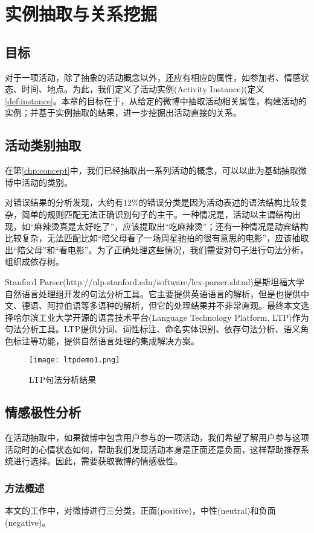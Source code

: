 \chapter{实例抽取与关系挖掘}
\section{目标}
对于一项活动，除了抽象的活动概念以外，还应有相应的属性，如参加者、情感状态、时间、地点。为此，我们定义了活动实例(Activity Instance)(定义\ref{def:instance}。本章的目标在于，从给定的微博中抽取活动相关属性，构建活动的实例；并基于实例抽取的结果，进一步挖掘出活动直接的关系。

\section{活动类别抽取}
在第\ref{chp:concept}中，我们已经抽取出一系列活动的概念，可以以此为基础抽取微博中活动的类别。

对错误结果的分析发现，大约有12\%的错误分类是因为活动表述的语法结构比较复杂，简单的规则匹配无法正确识别句子的主干。一种情况是，活动以主谓结构出现，如``麻辣烫真是太好吃了''，应该提取出``吃麻辣烫''；还有一种情况是动宾结构比较复杂，无法匹配比如``陪父母看了一场周星驰拍的很有意思的电影''，应该抽取出``陪父母''和``看电影''。为了正确处理这些情况，我们需要对句子进行句法分析，组织成依存树。

Stanford Parser(http://nlp.stanford.edu/software/lex-parser.shtml)是斯坦福大学自然语言处理组开发的句法分析工具。它主要提供英语语言的解析，但是也提供中文、德语、阿拉伯语等多语种的解析，但它的处理结果并不非常直观。最终本文选择哈尔滨工业大学开源的语言技术平台(Language Technology Platform, LTP)\cite{che2010ltp}作为句法分析工具。LTP提供分词、词性标注、命名实体识别、依存句法分析、语义角色标注等功能，提供自然语言处理的集成解决方案。

\begin{figure}[!h]
\centering
\texttt{[image: ltpdemo1.png]}
\caption{LTP句法分析结果}
\label{fig:ltp_demo}
\end{figure}

\section{情感极性分析}
在活动抽取中，如果微博中包含用户参与的一项活动，我们希望了解用户参与这项活动时的心情状态如何，帮助我们发现活动本身是正面还是负面，这样帮助推荐系统进行选择。因此，需要获取微博的情感极性。

\subsection{方法概述}
本文的工作中，对微博进行三分类，正面(positive)，中性(neutral)和负面(negative)。

